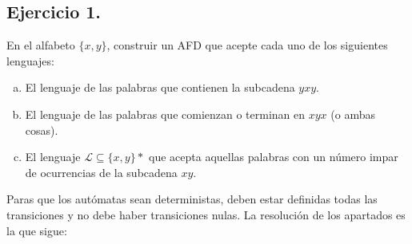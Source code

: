 \documentclass[11pt,a4paper]{article}
\begin{document}
\subsection{Ejercicio 1.} En el alfabeto $\{x,y\}$, construir un AFD que acepte cada uno de los siguientes lenguajes:
	\begin{enumerate}[a)]
		\item El lenguaje de las palabras que contienen la subcadena $yxy$.
		\item El lenguaje de las palabras que comienzan o terminan en $xyx$ (o ambas cosas).
		\item El lenguaje $\mathcal{L} \subseteq \{x,y\}*$ que acepta aquellas palabras con un número impar de ocurrencias de la subcadena $xy$. 
	\end{enumerate}
	
Paras que los autómatas sean deterministas, deben estar definidas todas las transiciones y no debe haber transiciones nulas. La resolución de los apartados es la que sigue:
\end{document}

